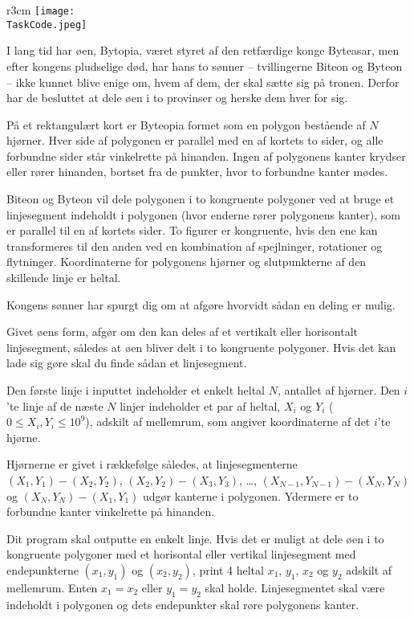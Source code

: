 \documentclass{boi2014-dk}
\renewcommand{\TaskCode}{demarcation}
\begin{document}
    \begin{wrapfigure}{r}{3cm}
        \vspace{-24pt}
		\texttt{[image: \\TaskCode.jpeg]}
	\end{wrapfigure}

    I lang tid har øen, Bytopia, været styret af den retfærdige konge Byteasar,
    men efter kongens pludselige død, har hans to sønner -- tvillingerne Biteon
    og Byteon -- ikke kunnet blive enige om, hvem af dem, der skal sætte sig på
    tronen. Derfor har de besluttet at dele øen i to provinser og herske dem
    hver for sig.

    På et rektangulært kort er Byteopia formet som en polygon bestående af $N$
    hjørner. Hver side af polygonen er parallel med en af kortets to sider, og
    alle forbundne sider står vinkelrette på hinanden. Ingen af polygonens kanter
    krydser eller rører hinanden, bortset fra de punkter, hvor to forbundne
    kanter mødes.

    Biteon og Byteon vil dele
    polygonen i to kongruente polygoner ved at bruge et linjesegment indeholdt i
    polygonen (hvor enderne rører polygonens kanter), som er parallel til en af
    kortets sider. To figurer er kongruente, hvis den ene kan transformeres til
    den anden ved en kombination af spejlninger, rotationer og flytninger.
    Koordinaterne for polygonens hjørner og slutpunkterne af den skillende linje
    er heltal.

    Kongens sønner har spurgt dig om at afgøre hvorvidt sådan en deling er mulig.

    \Task

    Givet øens form, afgør om den kan deles af et vertikalt eller horisontalt
    linjesegment, således at øen bliver delt i to kongruente polygoner. Hvis det
    kan lade sig gøre skal du finde sådan et linjesegment.

    \Input
    Den første linje i inputtet indeholder et enkelt heltal $N$, antallet af
    hjørner. Den $i$'te linje af de næste $N$ linjer indeholder et par af
    heltal, $X_i$ og $Y_i$ ($0\le X_i,Y_i\le 10^9$), adskilt af mellemrum,
    som angiver koordinaterne af det $i$'te hjørne.

    Hjørnerne er givet i rækkefølge således, at linjesegmenterne
    $(X_1,Y_1)-(X_2,Y_2)$, $(X_2,Y_2)-(X_3,Y_3)$, \ldots,
    $(X_{N-1},Y_{N-1})-(X_N,Y_N)$ og $(X_N,Y_N)-(X_1,Y_1)$ udgør kanterne i
    polygonen. Ydermere er to forbundne kanter vinkelrette på hinanden.

	\Output
    Dit program skal outputte en enkelt linje. Hvis det er muligt at dele øen i
    to kongruente polygoner med et horisontal eller vertikal linjesegment med
    endepunkterne $(x_1,y_1)$ og $(x_2,y_2)$, print 4 heltal $x_1$, $y_1$,
    $x_2$ og $y_2$ adskilt af mellemrum. Enten $x_1 = x_2$ eller $y_1 = y_2$
    skal holde. Linjesegmentet skal være indeholdt i polygonen og dets
    endepunkter skal røre polygonens kanter.
\end{document}
